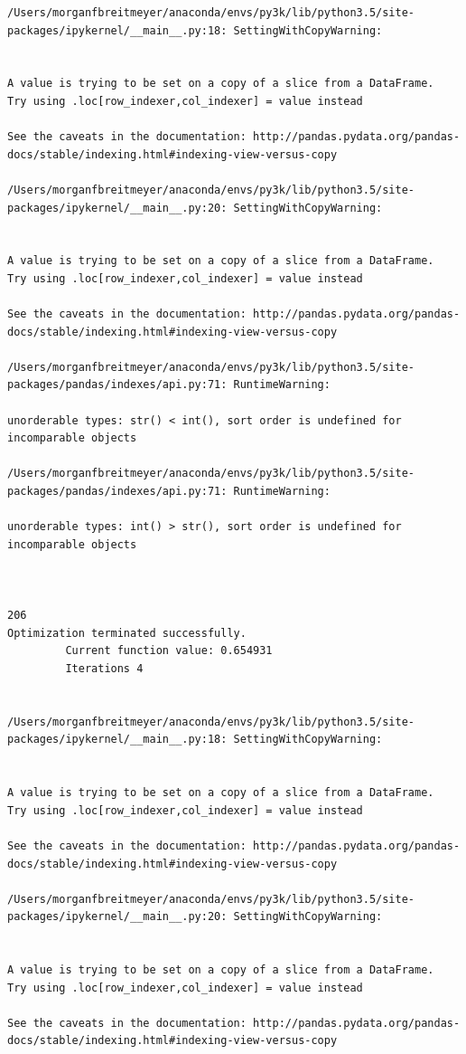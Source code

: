 \begin{lstlisting}
/Users/morganfbreitmeyer/anaconda/envs/py3k/lib/python3.5/site-packages/ipykernel/__main__.py:18: SettingWithCopyWarning:


A value is trying to be set on a copy of a slice from a DataFrame.
Try using .loc[row_indexer,col_indexer] = value instead

See the caveats in the documentation: http://pandas.pydata.org/pandas-docs/stable/indexing.html#indexing-view-versus-copy

/Users/morganfbreitmeyer/anaconda/envs/py3k/lib/python3.5/site-packages/ipykernel/__main__.py:20: SettingWithCopyWarning:


A value is trying to be set on a copy of a slice from a DataFrame.
Try using .loc[row_indexer,col_indexer] = value instead

See the caveats in the documentation: http://pandas.pydata.org/pandas-docs/stable/indexing.html#indexing-view-versus-copy

/Users/morganfbreitmeyer/anaconda/envs/py3k/lib/python3.5/site-packages/pandas/indexes/api.py:71: RuntimeWarning:

unorderable types: str() < int(), sort order is undefined for incomparable objects

/Users/morganfbreitmeyer/anaconda/envs/py3k/lib/python3.5/site-packages/pandas/indexes/api.py:71: RuntimeWarning:

unorderable types: int() > str(), sort order is undefined for incomparable objects



206
Optimization terminated successfully.
         Current function value: 0.654931
         Iterations 4


/Users/morganfbreitmeyer/anaconda/envs/py3k/lib/python3.5/site-packages/ipykernel/__main__.py:18: SettingWithCopyWarning:


A value is trying to be set on a copy of a slice from a DataFrame.
Try using .loc[row_indexer,col_indexer] = value instead

See the caveats in the documentation: http://pandas.pydata.org/pandas-docs/stable/indexing.html#indexing-view-versus-copy

/Users/morganfbreitmeyer/anaconda/envs/py3k/lib/python3.5/site-packages/ipykernel/__main__.py:20: SettingWithCopyWarning:


A value is trying to be set on a copy of a slice from a DataFrame.
Try using .loc[row_indexer,col_indexer] = value instead

See the caveats in the documentation: http://pandas.pydata.org/pandas-docs/stable/indexing.html#indexing-view-versus-copy


\end{lstlisting}
